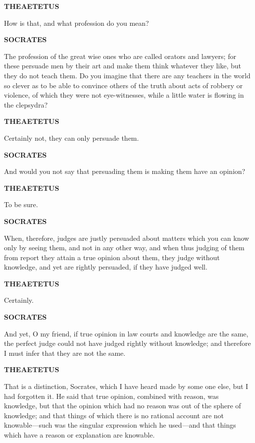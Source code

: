 \documentclass[11pt,letter]{article}
\begin{document}
\par \textbf{THEAETETUS}
\par   How is that, and what profession do you mean?

\par \textbf{SOCRATES}
\par   The profession of the great wise ones who are called orators and lawyers; for these persuade men by their art and make them think whatever they like, but they do not teach them. Do you imagine that there are any teachers in the world so clever as to be able to convince others of the truth about acts of robbery or violence, of which they were not eye-witnesses, while a little water is flowing in the clepsydra?

\par \textbf{THEAETETUS}
\par   Certainly not, they can only persuade them.

\par \textbf{SOCRATES}
\par   And would you not say that persuading them is making them have an opinion?

\par \textbf{THEAETETUS}
\par   To be sure.

\par \textbf{SOCRATES}
\par   When, therefore, judges are justly persuaded about matters which you can know only by seeing them, and not in any other way, and when thus judging of them from report they attain a true opinion about them, they judge without knowledge, and yet are rightly persuaded, if they have judged well.

\par \textbf{THEAETETUS}
\par   Certainly.

\par \textbf{SOCRATES}
\par   And yet, O my friend, if true opinion in law courts and knowledge are the same, the perfect judge could not have judged rightly without knowledge; and therefore I must infer that they are not the same.

\par \textbf{THEAETETUS}
\par   That is a distinction, Socrates, which I have heard made by some one else, but I had forgotten it. He said that true opinion, combined with reason, was knowledge, but that the opinion which had no reason was out of the sphere of knowledge; and that things of which there is no rational account are not knowable—such was the singular expression which he used—and that things which have a reason or explanation are knowable.
\end{document}
